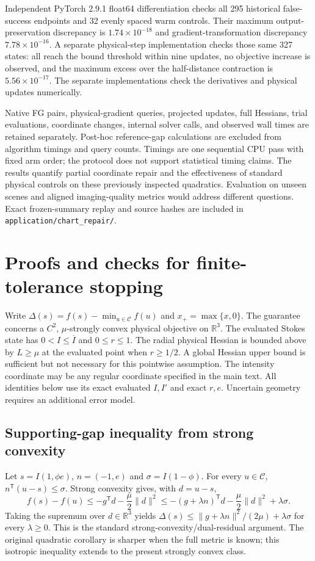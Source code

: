 Independent PyTorch 2.9.1 float64 differentiation checks all 295 historical false-success endpoints and 32 evenly spaced warm controls. Their maximum output-preservation discrepancy is $1.74\times10^{-18}$ and gradient-transformation discrepancy $7.78\times10^{-16}$. A separate physical-step implementation checks those same 327 states: all reach the bound threshold within nine updates, no objective increase is observed, and the maximum excess over the half-distance contraction is $5.56\times10^{-17}$. The separate implementations check the derivatives and physical updates numerically.

Native FG pairs, physical-gradient queries, projected updates, full Hessians, trial evaluations, coordinate changes, internal solver calls, and observed wall times are retained separately. Post-hoc reference-gap calculations are excluded from algorithm timings and query counts. Timings are one sequential CPU pass with fixed arm order; the protocol does not support statistical timing claims. The results quantify partial coordinate repair and the effectiveness of standard physical controls on these previously inspected quadratics. Evaluation on unseen scenes and aligned imaging-quality metrics would address different questions. Exact frozen-summary replay and source hashes are included in \nolinkurl{application/chart_repair/}.


\section{Proofs and checks for finite-tolerance stopping}
\label{SI-sec:sstopproof}
Write $\Delta(s)=f(s)-\min_{u\in\mathcal C}f(u)$ and $x_+=\max\{x,0\}$.
The guarantee concerns a $C^2$, $\mu$-strongly convex physical objective on $\mathbb R^3$. The evaluated Stokes state has $0<I\le\overline I$ and $0\le r\le1$. The radial physical Hessian is bounded above by $L\ge\mu$ at the evaluated point when $r\ge1/2$. A global Hessian upper bound is sufficient but not necessary for this pointwise assumption. The intensity coordinate may be any regular coordinate specified in the main text. All identities below use its exact evaluated $I,I'$ and exact $r,e$. Uncertain geometry requires an additional error model.

\subsection{Supporting-gap inequality from strong convexity}
Let $s=I(1,\phi e)$, $n=(-1,e)$ and $\sigma=I(1-\phi)$. For every $u\in\mathcal C$, $n^{\mathsf T}(u-s)\le\sigma$. Strong convexity gives, with $d=u-s$,
\begin{equation}
 f(s)-f(u)\le-g^{\mathsf T}d-\frac\mu2\|d\|^2
 \le-(g+\lambda n)^{\mathsf T}d-\frac\mu2\|d\|^2+\lambda\sigma.
 \label{SI-eq:sstrongsupport}
\end{equation}
Taking the supremum over $d\in\mathbb R^3$ yields $\Delta(s)\le\|g+\lambda n\|^2/(2\mu)+\lambda\sigma$ for every $\lambda\ge0$. This is the standard strong-convexity/dual-residual argument. The original quadratic corollary is sharper when the full metric is known; this isotropic inequality extends to the present strongly convex class.

